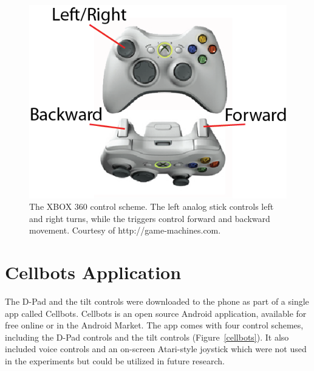 \documentclass[12pt, letterpaper]{report}
\begin{document}
\begin{figure}[h!]
	\centering
	\includegraphics[scale=0.4]{images/xbox_diagram}
	\caption{The XBOX 360 control scheme. The left analog stick controls left and right turns, while the triggers control forward and backward movement. Courtesy of http://game-machines.com\cite{xbox_diagram}.}
	\label{xbox_diagram}
\end{figure}

\section{Cellbots Application}
The D-Pad and the tilt controls were downloaded to the phone as part of a single app called Cellbots. Cellbots is an open source Android application, available for free online or in the Android Market. The app comes with four control schemes, including the D-Pad controls and the tilt controls (Figure~\ref{cellbots}). It also included voice controls and an on-screen Atari-style joystick which were not used in the experiments but could be utilized in future research\cite{cellbots}.
\end{document}
